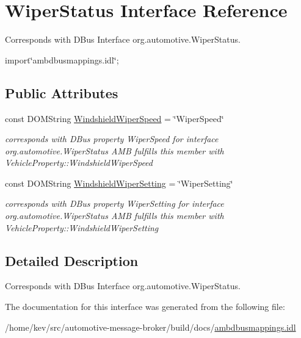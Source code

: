 \hypertarget{interfaceWiperStatus}{\section{Wiper\+Status Interface Reference}
\label{interfaceWiperStatus}
}


Corresponds with D\+Bus Interface org.\+automotive.\+Wiper\+Status.  




{\ttfamily import\char`\"{}ambdbusmappings.\+idl\char`\"{};}

\subsection*{Public Attributes}
\begin{DoxyCompactItemize}
\item 
\hypertarget{interfaceWiperStatus_a2450e48040a1ab0eacf41a069026801b}{const D\+O\+M\+String \hyperlink{interfaceWiperStatus_a2450e48040a1ab0eacf41a069026801b}{Windshield\+Wiper\+Speed} = \char`\"{}Wiper\+Speed\char`\"{}}\label{interfaceWiperStatus_a2450e48040a1ab0eacf41a069026801b}

\begin{DoxyCompactList}\small\item\em corresponds with D\+Bus property Wiper\+Speed for interface org.\+automotive.\+Wiper\+Status A\+M\+B fulfills this member with Vehicle\+Property\+::\+Windshield\+Wiper\+Speed \end{DoxyCompactList}\item 
\hypertarget{interfaceWiperStatus_a85849714f517ea47be7dded2874e4ed0}{const D\+O\+M\+String \hyperlink{interfaceWiperStatus_a85849714f517ea47be7dded2874e4ed0}{Windshield\+Wiper\+Setting} = \char`\"{}Wiper\+Setting\char`\"{}}\label{interfaceWiperStatus_a85849714f517ea47be7dded2874e4ed0}

\begin{DoxyCompactList}\small\item\em corresponds with D\+Bus property Wiper\+Setting for interface org.\+automotive.\+Wiper\+Status A\+M\+B fulfills this member with Vehicle\+Property\+::\+Windshield\+Wiper\+Setting \end{DoxyCompactList}\end{DoxyCompactItemize}


\subsection{Detailed Description}
Corresponds with D\+Bus Interface org.\+automotive.\+Wiper\+Status. 

The documentation for this interface was generated from the following file\+:\begin{DoxyCompactItemize}
\item 
/home/kev/src/automotive-\/message-\/broker/build/docs/\hyperlink{ambdbusmappings_8idl}{ambdbusmappings.\+idl}\end{DoxyCompactItemize}
